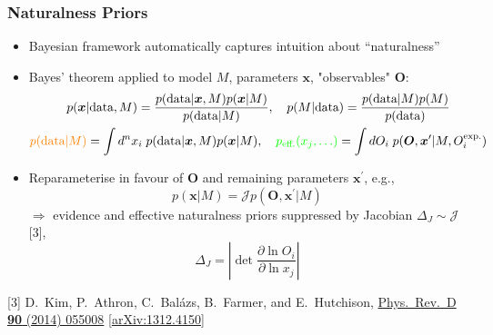 \documentclass[10pt,aspectratio=169]{beamer}
\begin{document}
\begin{frame}
  \frametitle{Naturalness Priors}
  \begin{itemize} \itemsep1em
  \item Bayesian framework {\color{blue} automatically captures
    intuition about ``naturalness''}
  \item Bayes' theorem applied to model $M$, parameters $\bm{x}$,
    "observables" $\bm{O}$:
    \begin{gather*}
      p(\bm{x}|\text{data},M) = \frac{p(\text{data}|\bm{x},M) p(\bm{x}|M)}
      {p(\text{data}|M)} , \quad
      p(M|\text{data}) = \frac{p(\text{data}|M) p(M)}{p(\text{data})} \\
      {\color{orange} p(\text{data}|M)}
      = \int d^n x_i\; p(\text{data}|
      \bm{x},M) p(\bm{x}|M), \quad
         {\color{green} p_{\text{eff.}}(x_j,\ldots)} = \int dO_i \;
         p(\bm{O}, \bm{x}^\prime | M, O_i^{\text{exp.}})
    \end{gather*}
  \item Reparameterise in favour of $\bm{O}$ and remaining parameters
    $\bm{x}^\prime$, e.g.,
    \begin{equation*}
      p(\bm{x}|M) = \mathcal{J} p(\bm{O},\bm{x}^\prime|M)
    \end{equation*}
    $\Rightarrow$ {\color{orange} evidence} and {\color{green}
      effective naturalness priors} {\color{blue} suppressed by Jacobian}
    $\Delta_J \sim \mathcal{J}$ [3],
    \begin{equation*}
      \Delta_J = \left | \det \frac{\partial \ln O_i}{\partial \ln x_j}
      \right |
    \end{equation*}
  \end{itemize}
      {
        \tiny
        [3] D.~Kim, P.~Athron, C.~Bal\'{a}zs, B.~Farmer, and E.~Hutchison,
        \href{https://doi.org/10.1103/PhysRevD.90.055008}{%
          Phys.~Rev.~D \textbf{90} (2014) 055008}
        [\href{http://arxiv.org/abs/1312.4150}{arXiv:1312.4150}]
      }
\end{frame}
\end{document}
